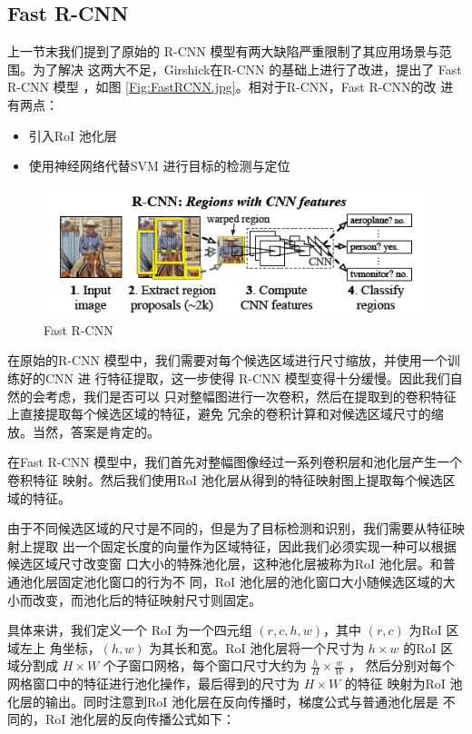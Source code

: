 \subsection{Fast R-CNN}

上一节末我们提到了原始的 R-CNN 模型有两大缺陷严重限制了其应用场景与范围。为了解决
这两大不足，Girshick在R-CNN 的基础上进行了改进，提出了 Fast R-CNN 模型
\cite{Girshick:2015ib}，如图 \ref{Fig:FastRCNN.jpg}。相对于R-CNN，Fast R-CNN的改
进有两点：

\begin{itemize}
  \item 引入RoI 池化层
  \item 使用神经网络代替SVM 进行目标的检测与定位
\end{itemize}

\begin{figure}
  \centering
  \includegraphics[width=0.8\linewidth]{./Figure/FastRCNN.png}
  \caption{Fast R-CNN\cite{Girshick:2015ib}}\label{Fig:FastRCNN}
\end{figure}

在原始的R-CNN 模型中，我们需要对每个候选区域进行尺寸缩放，并使用一个训练好的CNN 进
行特征提取，这一步使得 R-CNN 模型变得十分缓慢。因此我们自然的会考虑，我们是否可以
只对整幅图进行一次卷积，然后在提取到的卷积特征上直接提取每个候选区域的特征，避免
冗余的卷积计算和对候选区域尺寸的缩放。当然，答案是肯定的。

在Fast R-CNN 模型中，我们首先对整幅图像经过一系列卷积层和池化层产生一个卷积特征
映射。然后我们使用RoI 池化层从得到的特征映射图上提取每个候选区域的特征。

由于不同候选区域的尺寸是不同的，但是为了目标检测和识别，我们需要从特征映射上提取
出一个固定长度的向量作为区域特征，因此我们必须实现一种可以根据候选区域尺寸改变窗
口大小的特殊池化层，这种池化层被称为RoI 池化层。和普通池化层固定池化窗口的行为不
同，RoI 池化层的池化窗口大小随候选区域的大小而改变，而池化后的特征映射尺寸则固定。


具体来讲，我们定义一个 RoI 为一个四元组 $(r,c,h,w)$，其中 $(r,c)$ 为RoI 区域左上
角坐标，$(h, w)$ 为其长和宽。RoI 池化层将一个尺寸为 $h \times w$ 的RoI 区域分割成
$H \times W$ 个子窗口网格，每个窗口尺寸大约为 $\frac{h}{H} \times \frac{w}{W}$ ，
然后分别对每个网格窗口中的特征进行池化操作，最后得到的尺寸为 $H \times W$ 的特征
映射为RoI 池化层的输出。同时注意到RoI 池化层在反向传播时，梯度公式与普通池化层是
不同的，RoI 池化层的反向传播公式如下：

